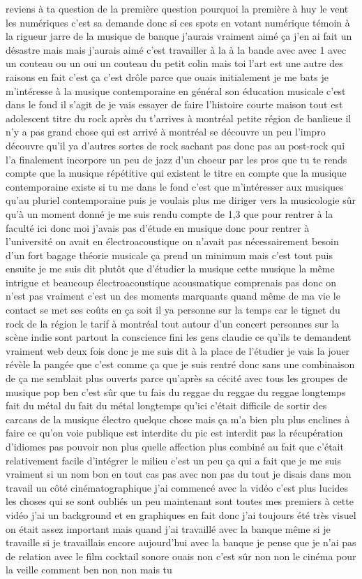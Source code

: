 reviens à ta question de la première question pourquoi la première à huy le vent les numériques c'est sa demande donc si ces spots en votant numérique témoin à la rigueur jarre de la musique de banque j'aurais vraiment aimé ça j'en ai fait un désastre mais mais j'aurais aimé c'est travailler à la à la bande avec avec 1 avec un couteau ou un oui un couteau du petit colin mais toi l'art est une autre des raisons en fait c'est ça c'est drôle parce que ouais initialement je me bats je m'intéresse à la musique contemporaine en général son éducation musicale c'est dans le fond il s'agit de je vais essayer de faire l'histoire courte maison tout est adolescent titre du rock après du t'arrives à montréal petite région de banlieue il n'y a pas grand chose qui est arrivé à montréal se découvre un peu l'impro découvre qu'il ya d'autres sortes de rock sachant pas donc pas au post-rock qui l'a finalement incorpore un peu de jazz d'un choeur par les pros que tu te rends compte que la musique répétitive qui existent le titre en compte que la musique contemporaine existe si tu me dans le fond c'est que m'intéresser aux musiques qu'au pluriel contemporaine puis je voulais plus me diriger vers la musicologie sûr qu'à un moment donné je me suis rendu compte de 1,3 que pour rentrer à la faculté ici donc moi j'avais pas d'étude en musique donc pour rentrer à l'université on avait en électroacoustique on n'avait pas nécessairement besoin d'un fort bagage théorie musicale ça prend un minimum mais c'est tout puis ensuite je me suis dit plutôt que d'étudier la musique cette musique la même intrigue et beaucoup électroacoustique acousmatique comprenais pas donc on n'est pas vraiment c'est un des moments marquants quand même de ma vie le contact se met ses coûts en ça soit il ya personne sur la temps car le tignet du rock de la région le tarif à montréal tout autour d'un concert personnes sur la scène indie sont partout la conscience fini les gens claudie ce qu'ils te demandent vraiment web deux fois donc je me suis dit à la place de l'étudier je vais la jouer révèle la pangée que c'est comme ça que je suis rentré donc sans une combinaison de ça me semblait plus ouverts parce qu'après sa cécité avec tous les groupes de musique pop ben c'est sûr que tu fais du reggae du reggae du reggae longtemps fait du métal du fait du métal longtemps qu'ici c'était difficile de sortir des carcans de la musique électro quelque chose mais ça m'a bien plu plus enclines à faire ce qu'on voie publique est interdite du pic est interdit pas la récupération d'idiomes pas pouvoir non plus quelle affection plus combiné au fait que c'était relativement facile d'intégrer le milieu c'est un peu ça qui a fait que je me suis vraiment si un nom bon en tout cas pas avec non pas du tout je disais dans mon travail un côté cinématographique j'ai commencé avec la vidéo c'est plus lucides les choses qui se sont oubliés un peu maintenant sont toutes mes premiers à cette vidéo j'ai un background et en graphiques en fait donc j'ai toujours été très visuel on était assez important mais quand j'ai travaillé avec la banque même si je travaille si je travaillais encore aujourd'hui avec la banque je pense que je n'ai pas de relation avec le film cocktail sonore ouais non c'est sûr non non le cinéma pour la veille comment ben non non mais tu 